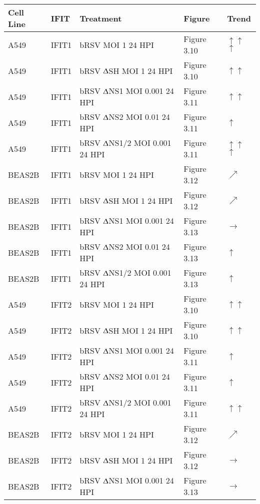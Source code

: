 \begin{table}
    \centering
    \begin{tabular}{lllll}
    \hline
        \textbf{Cell Line} & \textbf{IFIT} & \textbf{Treatment} & \textbf{Figure} & \textbf{Trend} \\ \hline
        A549 & IFIT1 & bRSV MOI 1 24 HPI & Figure 3.10 & \(\uparrow\)\(\uparrow\)\(\uparrow\) \\ 
        A549 & IFIT1 & bRSV $\Updelta$SH MOI 1 24 HPI & Figure 3.10 & \(\uparrow\)\(\uparrow\) \\ 
        A549 & IFIT1 & bRSV $\Updelta$NS1 MOI 0.001 24 HPI & Figure 3.11 & \(\uparrow\)\(\uparrow\) \\ 
        A549 & IFIT1 & bRSV $\Updelta$NS2 MOI 0.01 24 HPI & Figure 3.11 & \(\uparrow\) \\ 
        A549 & IFIT1 & bRSV $\Updelta$NS1/2 MOI 0.001 24 HPI & Figure 3.11 & \(\uparrow\)\(\uparrow\)\(\uparrow\) \\ 
        BEAS2B & IFIT1 & bRSV MOI 1 24 HPI & Figure 3.12 & \(\nearrow\) \\ 
        BEAS2B & IFIT1 & bRSV $\Updelta$SH MOI 1 24 HPI & Figure 3.12 & \(\nearrow\) \\ 
        BEAS2B & IFIT1 & bRSV $\Updelta$NS1 MOI 0.001 24 HPI & Figure 3.13 & \(\rightarrow\) \\ 
        BEAS2B & IFIT1 & bRSV $\Updelta$NS2 MOI 0.01 24 HPI & Figure 3.13 & \(\uparrow\) \\ 
        BEAS2B & IFIT1 & bRSV $\Updelta$NS1/2 MOI 0.001 24 HPI & Figure 3.13 & \(\uparrow\) \\ 
        A549 & IFIT2 & bRSV MOI 1 24 HPI & Figure 3.10 & \(\uparrow\)\(\uparrow\) \\ 
        A549 & IFIT2 & bRSV $\Updelta$SH MOI 1 24 HPI & Figure 3.10 & \(\uparrow\)\(\uparrow\) \\ 
        A549 & IFIT2 & bRSV $\Updelta$NS1 MOI 0.001 24 HPI & Figure 3.11 & \(\uparrow\) \\ 
        A549 & IFIT2 & bRSV $\Updelta$NS2 MOI 0.01 24 HPI & Figure 3.11 & \(\uparrow\) \\ 
        A549 & IFIT2 & bRSV $\Updelta$NS1/2 MOI 0.001 24 HPI & Figure 3.11 & \(\uparrow\)\(\uparrow\) \\ 
        BEAS2B & IFIT2 & bRSV MOI 1 24 HPI & Figure 3.12 & \(\nearrow\) \\ 
        BEAS2B & IFIT2 & bRSV $\Updelta$SH MOI 1 24 HPI & Figure 3.12 & \(\rightarrow\) \\ 
        BEAS2B & IFIT2 & bRSV $\Updelta$NS1 MOI 0.001 24 HPI & Figure 3.13 & \(\rightarrow\) \\ 

\end{tabular}
\end{table}
